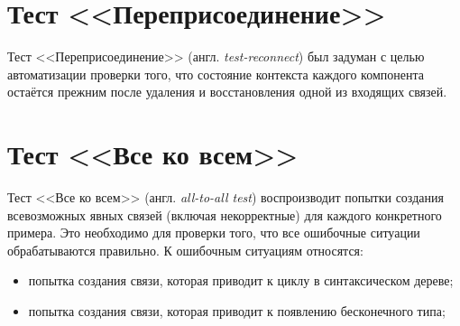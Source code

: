 \section{Тест <<Переприсоединение>>}
Тест <<Переприсоединение>> (англ. \textit{test-reconnect}) был задуман с целью автоматизации проверки того, что состояние контекста каждого компонента остаётся прежним после удаления и восстановления одной из входящих связей.
\section{Тест <<Все ко всем>>}
Тест <<Все ко всем>> (англ. \textit{all-to-all test}) воспроизводит попытки создания всевозможных явных связей (включая некорректные) для каждого конкретного примера. Это необходимо для проверки того, что все ошибочные ситуации обрабатываются правильно. К ошибочным ситуациям относятся:
\begin{itemize}
	\item попытка создания связи, которая приводит к циклу в синтаксическом дереве;
	\item попытка создания связи, которая приводит к появлению бесконечного типа;
\end{itemize}

\Conc

\nocite{*}
\printbibliography[%
    heading=bibintoc%
]





